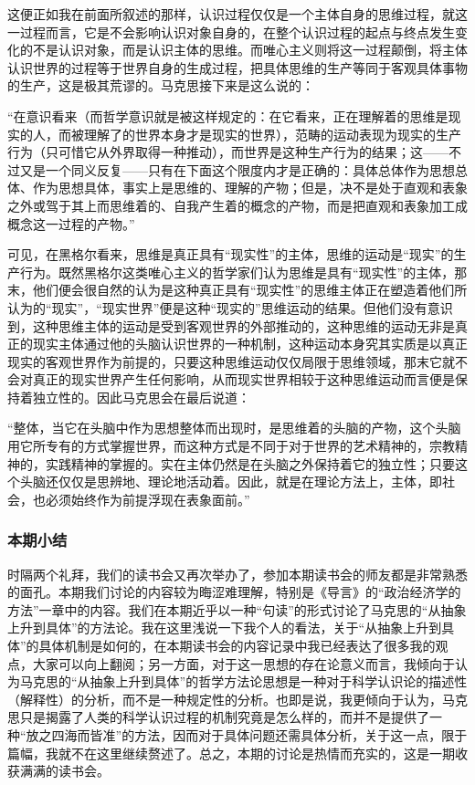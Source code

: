 \documentclass[a4paper,twoside,12pt,AutoFakeBold]{ctexart}
\begin{document}
这便正如我在前面所叙述的那样，认识过程仅仅是一个主体自身的思维过程，就这一过程而言，它是不会影响认识对象自身的，在整个认识过程的起点与终点发生变化的不是认识对象，而是认识主体的思维。而唯心主义则将这一过程颠倒，将主体认识世界的过程等于世界自身的生成过程，把具体思维的生产等同于客观具体事物的生产，这是极其荒谬的。马克思接下来是这么说的：
\begin{adjustwidth}{2em}{2em}
    \qquad\fangsong
“在意识看来（而哲学意识就是被这样规定的：在它看来，正在理解着的思维是现实的人，而被理解了的世界本身才是现实的世界），范畴的运动表现为现实的生产行为（只可惜它从外界取得一种推动），而世界是这种生产行为的结果；这——不过又是一个同义反复——只有在下面这个限度内才是正确的：具体总体作为思想总体、作为思想具体，事实上是思维的、理解的产物；但是，决不是处于直观和表象之外或驾于其上而思维着的、自我产生着的概念的产物，而是把直观和表象加工成概念这一过程的产物。”
\end{adjustwidth}

可见，在黑格尔看来，思维是真正具有“现实性”的主体，思维的运动是“现实”的生产行为。既然黑格尔这类唯心主义的哲学家们认为思维是具有“现实性”的主体，那末，他们便会很自然的认为是这种真正具有“现实性”的思维主体正在塑造着他们所认为的“现实”，“现实世界”便是这种“现实的”思维运动的结果。但他们没有意识到，这种思维主体的运动是受到客观世界的外部推动的，这种思维的运动无非是真正的现实主体通过他的头脑认识世界的一种机制，这种运动本身究其实质是以真正现实的客观世界作为前提的，只要这种思维运动仅仅局限于思维领域，那末它就不会对真正的现实世界产生任何影响，从而现实世界相较于这种思维运动而言便是保持着独立性的。因此马克思会在最后说道：
\begin{adjustwidth}{2em}{2em}
    \qquad\fangsong
“整体，当它在头脑中作为思想整体而出现时，是思维着的头脑的产物，这个头脑用它所专有的方式掌握世界，而这种方式是不同于对于世界的艺术精神的，宗教精神的，实践精神的掌握的。实在主体仍然是在头脑之外保持着它的独立性；只要这个头脑还仅仅是思辨地、理论地活动着。因此，就是在理论方法上，主体，即社会，也必须始终作为前提浮现在表象面前。”
\end{adjustwidth}


\subsubsection{本期小结}
时隔两个礼拜，我们的读书会又再次举办了，参加本期读书会的师友都是非常熟悉的面孔。本期我们讨论的内容较为晦涩难理解，特别是《导言》的“政治经济学的方法”一章中的内容。我们在本期近乎以一种“句读”的形式讨论了马克思的“从抽象上升到具体”的方法论。我在这里浅说一下我个人的看法，关于“从抽象上升到具体”的具体机制是如何的，在本期读书会的内容记录中我已经表达了很多我的观点，大家可以向上翻阅；另一方面，对于这一思想的存在论意义而言，我倾向于认为马克思的“从抽象上升到具体”的哲学方法论思想是一种对于科学认识论的描述性（解释性）的分析，而不是一种规定性的分析。也即是说，我更倾向于认为，马克思只是揭露了人类的科学认识过程的机制究竟是怎么样的，而并不是提供了一种“放之四海而皆准”的方法，因而对于具体问题还需具体分析，关于这一点，限于篇幅，我就不在这里继续赘述了。总之，本期的讨论是热情而充实的，这是一期收获满满的读书会。
\end{document}
